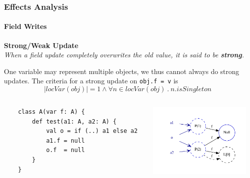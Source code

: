 \documentclass[hyperref={pdfpagelabels=false}]{beamer}
\begin{document}
\begin{frame}[fragile]
    \frametitle{Effects Analysis}
    \framesubtitle{Field Writes}

    \textbf{Strong/Weak Update} \\
    \emph{ When a field update completely overwrites the old value, it is said
    to be \textbf{strong}.}

    \vspace{10pt}

    One variable may represent multiple objects, we thus cannot always do
    strong updates. The criteria for a strong update on \lstinline{obj.f = v}
    is
    $$|locVar(obj)| = 1 \land \forall n \in locVar(obj) ~.~ n.isSingleton$$

    \begin{columns}
      \begin{column}{0.4\textwidth}
\begin{lstlisting}
    class A(var f: A) {
        def test(a1: A, a2: A) {
            val o = if (..) a1 else a2
            a1.f = null
            o.f  = null
        }
    }
\end{lstlisting}
      \end{column}
      \begin{column}{0.5\textwidth}
        \includegraphics[width=50mm]{images/writes.pdf}
      \end{column}
    \end{columns}
\end{frame}
\end{document}

